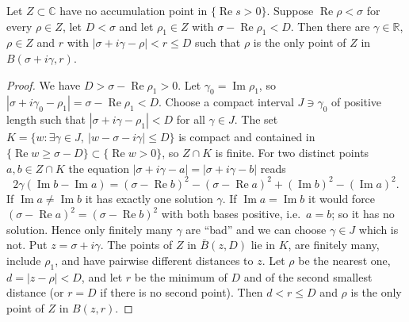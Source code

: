 \begin{lemma}[A point on the line $\operatorname{Re}s=\sigma$ with a unique nearest pole]\label{lem:E-nearest}

\par{}\par
Let $Z\subset\mathbb C$ have no accumulation point in $\{\operatorname{Re}s>0\}$. Suppose
$\operatorname{Re}\rho<\sigma$ for every $\rho\in Z$, let $D<\sigma$ and let $\rho_1\in Z$ with $\sigma-\operatorname{Re}\rho_1<D$. Then
there are $\gamma\in\mathbb R$, $\rho\in Z$ and $r$ with
$|\sigma+i\gamma-\rho|<r\le D$ such that $\rho$ is the only point of $Z$ in
$B(\sigma+i\gamma,r)$.
\end{lemma}
\begin{proof}
We have $D>\sigma-\operatorname{Re}\rho_1>0$. Let $\gamma_0=\operatorname{Im}\rho_1$, so $|\sigma+i\gamma_0-\rho_1|=\sigma-\operatorname{Re}\rho_1<D$.
Choose a compact interval $J\ni\gamma_0$ of positive length such that
$|\sigma+i\gamma-\rho_1|<D$ for all $\gamma\in J$. The set
$K=\{w:\exists\gamma\in J,\ |w-\sigma-i\gamma|\le D\}$ is compact and contained in
$\{\operatorname{Re}w\ge\sigma-D\}\subset\{\operatorname{Re}w>0\}$, so $Z\cap K$ is finite. For two
distinct points $a,b\in Z\cap K$ the equation $|\sigma+i\gamma-a|=|\sigma+i\gamma-b|$ reads
\[
2\gamma(\operatorname{Im}b-\operatorname{Im}a)=(\sigma-\operatorname{Re}b)^{2}-(\sigma-\operatorname{Re}a)^{2}
+(\operatorname{Im}b)^{2}-(\operatorname{Im}a)^{2}.
\]
If $\operatorname{Im}a\neq\operatorname{Im}b$ it has exactly one solution $\gamma$. If
$\operatorname{Im}a=\operatorname{Im}b$ it would force
$(\sigma-\operatorname{Re}a)^{2}=(\sigma-\operatorname{Re}b)^{2}$ with both bases positive, i.e.\
$a=b$; so it has no solution. Hence only finitely many $\gamma$ are ``bad'' and we can choose
$\gamma\in J$ which is not. Put $z=\sigma+i\gamma$. The points of $Z$ in $\bar B(z,D)$ lie in $K$,
are finitely many, include $\rho_1$, and have pairwise different distances to $z$. Let $\rho$ be the
nearest one, $d=|z-\rho|<D$, and let $r$ be the minimum of $D$ and of the second smallest distance
(or $r=D$ if there is no second point). Then $d<r\le D$ and $\rho$ is the only point of $Z$ in
$B(z,r)$.

\end{proof}

